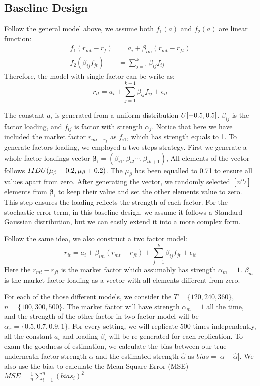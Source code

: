 	\subsection{Baseline Design}\label{base}
	Follow the general model above, we assume both $f_1(a)$ and $f_2(a)$ are linear function:
	\begin{align*}
f_1({r_{mt} - r_f}) &= a_{i} +\beta_{im} (r_{mt} - r_{ft})\\
	f_2(\beta_{ij}f_{jt}) &=\sum_{j = 1}^{k}\beta_{ij}f_{ij}
	\end{align*}
	Therefore, the model with single factor can be write as:
	\[   r_{it} = a_i + \sum_{j = 1}^{k+1}  \beta_{ij}f_{ij} +\epsilon_{it}   \]
	
	The constant $a_i$ is generated from a uniform distribution $\mathnormal{U}[-0.5, 0.5]$.
	$\beta_{ij}$ is the factor loading, and $f_{ij}$ is factor with strength $\alpha_{j}$. 
	Notice that here we have included the market factor $r_{mi - r_f}$ as $f_{i1}$, which has strength equals to 1.
	To generate factors loading, we employed a two steps strategy.
	First we generate a whole factor loadings vector $\mathbf{\beta_i} = (\beta_{i1}, \beta_{i2} \cdots, \beta_{ik+1})$,
	All elements of the vector follows $\mathnormal{IIDU}(\mu_{\beta} -0.2, \mu_{\beta} + 0.2)$. 
	The $\mu_{\beta}$ has been equalled to 0.71 to ensure all values apart from zero. 
	After generating the vector, we randomly selected $[n^{\alpha_{j}}]$ elements from $\mathbf{\beta_i}$ to keep their value and set the other elements value to zero. 
	This step ensures the loading reflects the strength of each factor. 
	For the stochastic error term, in this baseline design, we assume it follows a Standard Gaussian distribution, but we can easily extend it into a more complex form.
	
	Follow the same idea, we also construct a two factor model:
	\[   r_{it} = a_i + \beta_{im} (r_{mt} - r_{ft})  + \sum_{j = 1}^k\beta_{ij}f_{jt} +\epsilon_{it}   \]
	Here the $r_{mt} - r_{ft}$ is the market factor which assumably  has strength $\alpha_{m} = 1$. 
	${\beta_m}$ is the market factor loading as a vector with all elements different from zero. 
	
	For each of the those different models, we consider the $T = \{120, 240, 360\}$, $n =\{100, 300, 500\} $.
	The market factor will have strength $\alpha_m = 1$ all the time, and the strength of the other factor in two factor model will be $\alpha_{x} = \{0.5, 0.7, 0.9,1\}$. For every setting, we will replicate 500 times independently, all the constant $a_i$ and loading $\beta_i$ will be re-generated for each replication.
	To exam the goodness of estimation, we calculate the bias between our true underneath factor strength $\alpha$ and the estimated strength $\hat{\alpha}$ as $ bias = |\alpha - \hat{\alpha}|$. 
	We also use the bias to calculate the Mean Square Error (MSE) $MSE =\frac{1}{n}\sum_{i=1}^{n}(bias_i)^2 $
\newpage


